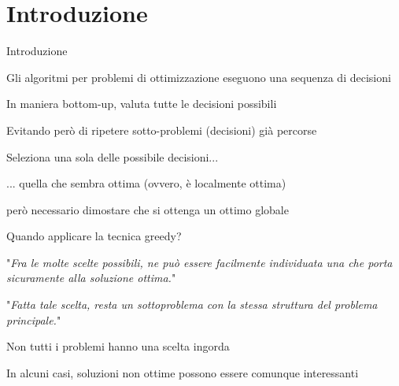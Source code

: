 \FrameContent



\section{Introduzione}

\begin{frame}{Introduzione}

\vspace{-9pt}
\begin{myboxtitle}
\BI
\item Gli algoritmi per problemi di ottimizzazione eseguono una sequenza di decisioni
\EI
\end{myboxtitle}

\begin{myboxtitle}
\BI
\item In maniera bottom-up, valuta tutte le decisioni possibili
\item Evitando però di ripetere sotto-problemi (decisioni) già percorse
\EI
\end{myboxtitle}

\begin{myboxtitle}
\BI
\item Seleziona una sola delle possibile decisioni...
\item ... quella che sembra ottima (ovvero, è localmente ottima)
\item \EE però necessario dimostare che si ottenga un ottimo globale
\EI
\end{myboxtitle}
\end{frame}


\begin{frame}{Quando applicare la tecnica greedy?}

\vspace{-9pt}
\begin{myboxtitle}
"\emph{Fra le molte scelte possibili, ne può essere facilmente individuata una che porta sicuramente alla soluzione ottima.}"
\end{myboxtitle}

\begin{myboxtitle}
"\emph{Fatta tale scelta, resta un sottoproblema con la stessa struttura del problema principale.}"
\end{myboxtitle}

\begin{myboxtitle}[Note]
\BI
\item Non tutti i problemi hanno una scelta ingorda
\item In alcuni casi, soluzioni non ottime possono essere comunque interessanti
\EI
\end{myboxtitle}

\end{frame}

